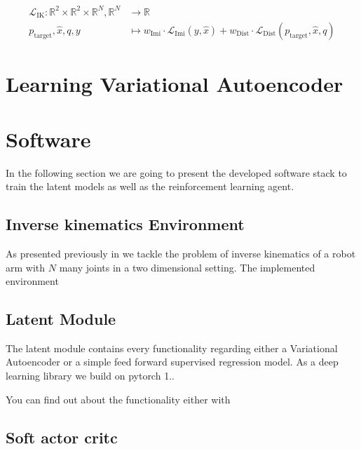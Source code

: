 \begin{equation}\label{eqn:IK-Loss}
    \begin{split}
        \mathcal{L}_\text{IK}: \mathbb{R}^2 \times \mathbb{R}^2 \times \mathbb{R}^N, \mathbb{R}^N & \to \mathbb{R} \\
        p_\text{target}, \hat{x}, q, y  &\mapsto w_\text{Imi} \cdot \mathcal{L}_\text{Imi}(y, \hat{x}) + w_\text{Dist} \cdot \mathcal{L}_\text{Dist}(p_\text{target}, \hat{x}, q)
    \end{split}
\end{equation}

\section{Learning Variational Autoencoder}


\section{Software}

In the following section we are going to present the developed software stack to train the latent models as well as the reinforcement learning agent.

\subsection{Inverse kinematics Environment}

As presented previously in  we tackle the problem of inverse kinematics of a robot arm with $N$ many joints in a two dimensional setting. 
The implemented environment

\subsection{Latent Module}

The latent module contains every functionality regarding either a Variational Autoencoder or a simple feed forward supervised regression model.
As a deep learning library we build on pytorch 1.. 

You can find out about the functionality either with 



\subsection{Soft actor critc}

